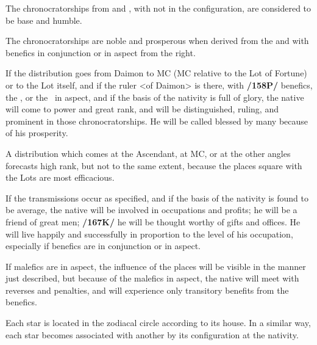 The chronocratorships from \Saturn\xspace and \Mars, with \Jupiter\xspace not in the configuration, are considered to be base and humble. 

The chronocratorships are noble and prosperous when derived from the \Sun\xspace and \Moon\xspace with benefics in
conjunction or in aspect from the right.

If the distribution goes from Daimon to MC (MC relative to the Lot of Fortune) or to the Lot itself, and if the ruler <of Daimon> is there, with \textbf{/158P/} benefics, the \Sun, or the \Moon\, in aspect, and if the basis of the nativity is full of glory, the native will come to power and great rank, and will be distinguished, ruling, and prominent in those chronocratorships. He will be called blessed by many because of his prosperity. 

A distribution which comes at the Ascendant, at MC, or at the other angles forecasts high rank, but not to the same extent, because the places square with the Lots are most efficacious.

If the transmissions occur as specified, and if the basis of the nativity is found to be average, the native will be involved in occupations and profits; he will be a friend of great men; \textbf{/167K/} he will be thought worthy of gifts and offices. He will live happily and successfully in proportion to the level of his occupation, especially if benefics are in conjunction or in aspect. 

If malefics are in aspect, the influence of the places will be visible in the manner just described, but because of the malefics in aspect, the native will meet with reverses and penalties, and will experience only transitory benefits from the benefics.

Each star is located in the zodiacal circle according to its house. In a similar way, each star becomes associated with another by its configuration at the nativity.

\newpage
